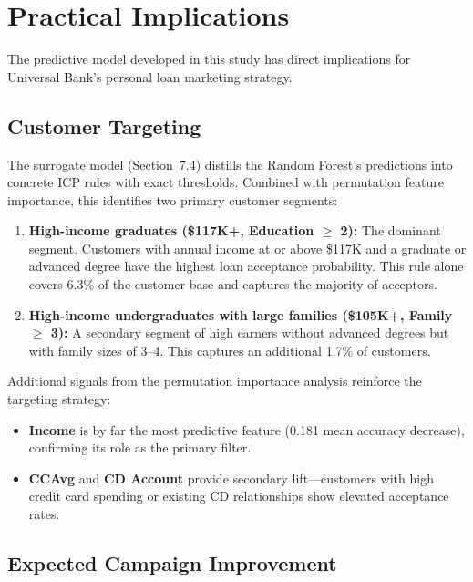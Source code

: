 \documentclass[11pt, a4paper]{article}
\begin{document}
\section{Practical Implications}

The predictive model developed in this study has direct implications for
Universal Bank's personal loan marketing strategy.

\subsection{Customer Targeting}

The surrogate model (Section~7.4) distills the Random Forest's predictions into
concrete ICP rules with exact thresholds. Combined with permutation feature
importance, this identifies two primary customer segments:

\begin{enumerate}[leftmargin=*, itemsep=4pt]
    \item \textbf{High-income graduates (\$117K+, Education $\geq$ 2):}
          The dominant segment. Customers with annual income at or above \$117K
          and a graduate or advanced degree have the highest loan acceptance
          probability. This rule alone covers 6.3\% of the customer base and
          captures the majority of acceptors.

    \item \textbf{High-income undergraduates with large families (\$105K+,
          Family $\geq$ 3):} A secondary segment of high earners without
          advanced degrees but with family sizes of 3--4. This captures an
          additional 1.7\% of customers.
\end{enumerate}

Additional signals from the permutation importance analysis reinforce the
targeting strategy:
\begin{itemize}[itemsep=2pt]
    \item \textbf{Income} is by far the most predictive feature (0.181 mean
          accuracy decrease), confirming its role as the primary filter.
    \item \textbf{CCAvg} and \textbf{CD Account} provide secondary lift---customers
          with high credit card spending or existing CD relationships show
          elevated acceptance rates.
\end{itemize}

\subsection{Expected Campaign Improvement}
\end{document}
